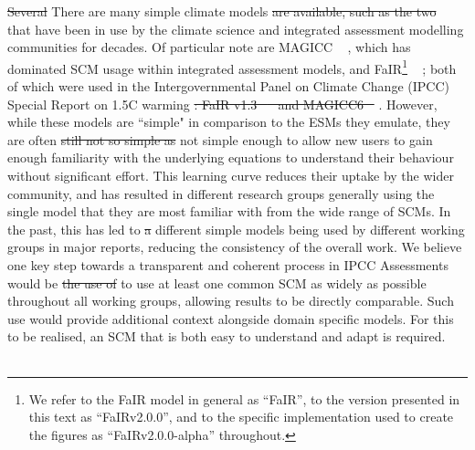 \documentclass[gmd, manuscript]{copernicus}
\providecommand{\DIFadd}[1]{{\protect\color{blue}#1}} %
\providecommand{\DIFdel}[1]{{\protect\color{red}\sout{#1}}}                      %
\providecommand{\DIFaddbegin}{} %
\providecommand{\DIFaddend}{} %
\providecommand{\DIFdelbegin}{} %
\providecommand{\DIFdelend}{} %
\begin{document}
%
\DIFdelbegin \DIFdel{Several }\DIFdelend \DIFaddbegin \DIFadd{There are many }\DIFaddend simple climate models \DIFdelbegin \DIFdel{are available, such as the two }\DIFdelend \DIFaddbegin \DIFadd{\mbox{%
\citep{Nicholls2019} }\hspace{0pt}%
that have been in use by the climate science and integrated assessment modelling communities for decades. Of particular note are MAGICC \mbox{%
\citep{Meinshausen2011}}\hspace{0pt}%
, which has dominated SCM usage within integrated assessment models, and FaIR}\footnote{\DIFadd{We refer to the FaIR model in general as ``FaIR'', to the version presented in this text as ``FaIRv2.0.0'', and to the specific implementation used to create the figures as ``FaIRv2.0.0-alpha'' throughout.}} \DIFadd{\mbox{%
\citep{Smith2018}}\hspace{0pt}%
; both of which were }\DIFaddend used in the Intergovernmental Panel on Climate Change (IPCC) Special Report on 1.5\textdegree C warming \citep[SR15]{IPCC2018}\DIFdelbegin \DIFdel{: FaIR v1.3 \mbox{%
\citep{Smith2018} }\hspace{0pt}%
and MAGICC6 \mbox{%
\citep{Meinshausen2011}}\hspace{0pt}%
}\DIFdelend . However, while these models are ``simple" in comparison to the ESMs they emulate, they are often \DIFdelbegin \DIFdel{still not so simple as }\DIFdelend \DIFaddbegin \DIFadd{not simple enough }\DIFaddend to allow new users to gain enough familiarity with the underlying equations to understand their behaviour without significant effort. This learning curve reduces their uptake by the wider community, and has resulted in different research groups generally using the single model that they are most familiar with \citep{Nicholls2019} from the wide range of SCMs. In the past, this has led to \DIFdelbegin \DIFdel{a }\DIFdelend different simple models being used by different working groups in major reports, reducing the consistency of the overall work. We believe one key step towards a transparent and coherent process in IPCC Assessments would be \DIFdelbegin \DIFdel{the use of }\DIFdelend \DIFaddbegin \DIFadd{to use }\DIFaddend at least one common SCM as widely as possible throughout all working groups, allowing results to be directly comparable. Such use would provide additional context alongside domain specific models. For this to be realised, an SCM that is both easy to understand and adapt is required.\\\\
\end{document}
